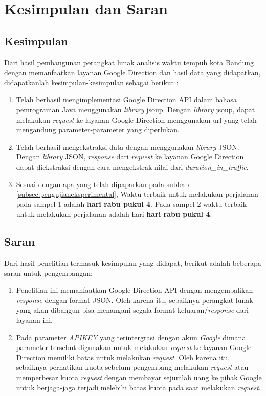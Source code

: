 \chapter{Kesimpulan dan Saran}
\label{chap:kesimpulandansaran}

\section{Kesimpulan}
\label{sec:kesimpulan}

Dari hasil pembangunan perangkat lunak analisis waktu tempuh kota Bandung dengan memanfaatkan layanan Google Direction dan hasil data yang didapatkan, didapatkanlah kesimpulan-kesimpulan sebagai berikut :

\begin{enumerate} 
	\item Telah berhasil mengimplementasi Google Direction API dalam bahasa pemrograman Java menggunakan \textit{library} jsoup. Dengan \textit{library} jsoup, dapat melakukan \textit{request} ke layanan Google Direction menggunakan url yang telah mengandung parameter-parameter yang diperlukan. 
	\item Telah berhasil mengekstraksi data dengan menggunakan \textit{library} JSON. Dengan \textit{library} JSON, \textit{response} dari \textit{request} ke layanan Google Direction dapat diekstraksi dengan cara mengekstrak nilai dari \textit{duration\_in\_traffic}.
	\item Sesuai dengan apa yang telah dipaparkan pada subbab \ref{subsec:pengujianeksperimental}, Waktu terbaik untuk melakukan perjalanan pada sampel 1 adalah \textbf{hari rabu pukul 4}. Pada sampel 2 waktu terbaik untuk melakukan perjalanan adalah hari \textbf{hari rabu pukul 4}.
\end{enumerate}

\section{Saran}
\label{sec:saran}

Dari hasil penelitian termasuk kesimpulan yang didapat, berikut adalah beberapa saran untuk pengembangan:

\begin{enumerate} 
	\item Penelitian ini memanfaatkan Google Direction API dengan mengembalikan \textit{response} dengan format JSON. Oleh karena itu, sebaiknya perangkat lunak yang akan dibangun bisa menangani segala format keluaran/\textit{response} dari layanan ini.
	\item Pada parameter \textit{APIKEY} yang terintergrasi dengan akun \textit{Google} dimana parameter tersebut digunakan untuk melakukan \textit{request} ke layanan Google Direction memiliki batas untuk melakukan \textit{request}. Oleh karena itu, sebaiknya perhatikan kuota sebelum pengembang melakukan \textit{request} atau memperbesar kuota \textit{request} dengan membayar sejumlah uang ke pihak Google untuk berjaga-jaga terjadi melebihi batas kuota pada saat melakukan \textit{request}.
\end{enumerate}